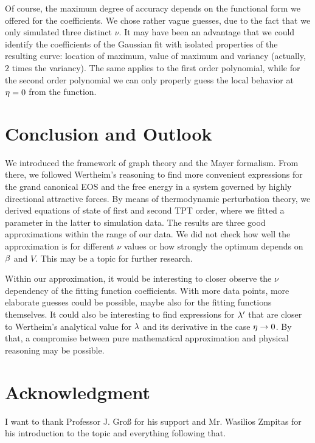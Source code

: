 \documentclass[8.5pt,twoside,twocolumn]{article}
\theoremstyle{standard}
\begin{document}
Of course, the maximum degree of accuracy depends on the functional form we offered for the
coefficients. We chose rather vague guesses, due to the fact that we only simulated three
distinct $\nu$. It may have been an advantage that we could identify the coefficients
of the Gaussian fit with isolated properties of the resulting curve: location of maximum, value of
maximum and variancy (actually, $2$ times the variancy). The same applies to
the first order polynomial, while for the second order polynomial we can only
properly guess the local behavior at $\eta=0$ from the function.


\section{Conclusion and Outlook}
\label{Con}
We introduced the framework of graph theory and the Mayer formalism. From there, we
followed Wertheim's reasoning to find more convenient expressions for the grand
canonical EOS and the free energy in a system governed by highly directional
attractive forces. By means of thermodynamic perturbation theory, we derived equations
of state of first and second TPT order, where we fitted a parameter in the latter
to simulation data. The results are three good approximations within the range of
our data. We did not check how well the approximation is for different $\nu$ values
or how strongly the optimum depends on $\beta$ and $V$. This may be a topic for further
research.

Within our approximation, it would be interesting to closer observe the $\nu$ dependency
of the fitting function coefficients. With more data points, more elaborate guesses
could be possible, maybe also for the fitting functions themselves. It could also
be interesting to find expressions for $\lambda'$ that are closer to Wertheim's
analytical value for $\lambda$ and its derivative in the case \mbox{$\eta \rightarrow 0$}. By that, a compromise
between pure mathematical approximation and physical reasoning may be possible.

\section*{Acknowledgment}
I want to thank Professor J. Groß for his support and Mr. Wasilios Zmpitas for
his introduction to the topic and everything following that.   


% 


\end{document}

